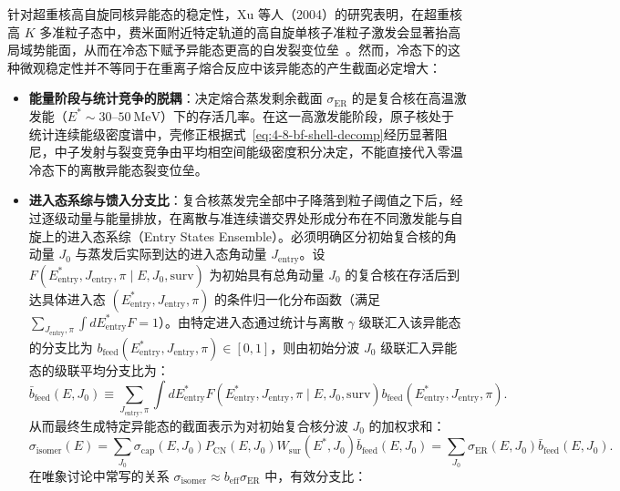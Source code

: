针对超重核高自旋同核异能态的稳定性，Xu 等人（2004）的研究表明，在超重核高 $K$ 多准粒子态中，费米面附近特定轨道的高自旋单核子准粒子激发会显著抬高局域势能面，从而在冷态下赋予异能态更高的自发裂变位垒~\cite{xu-2004-superheavy-high-spin-isomer-stability}。然而，冷态下的这种微观稳定性并不等同于在重离子熔合反应中该异能态的产生截面必定增大：
\begin{itemize}
\item \textbf{能量阶段与统计竞争的脱耦}：决定熔合蒸发剩余截面 $\sigma_{\mathrm{ER}}$ 的是复合核在高温激发能（$E^* \sim 30$--$50\ \mathrm{MeV}$）下的存活几率。在这一高激发能阶段，原子核处于统计连续能级密度谱中，壳修正根据式~\eqref{eq:4-8-bf-shell-decomp}经历显著阻尼，中子发射与裂变竞争由平均相空间能级密度积分决定，不能直接代入零温冷态下的离散异能态裂变位垒。
\item \textbf{进入态系综与馈入分支比}：复合核蒸发完全部中子降落到粒子阈值之下后，经过逐级动量与能量排放，在离散与准连续谱交界处形成分布在不同激发能与自旋上的进入态系综（Entry States Ensemble）。必须明确区分初始复合核的角动量 $J_0$ 与蒸发后实际到达的进入态角动量 $J_{\mathrm{entry}}$。设 $F(E_{\mathrm{entry}}^*, J_{\mathrm{entry}}, \pi \mid E, J_0, \mathrm{surv})$ 为初始具有总角动量 $J_0$ 的复合核在存活后到达具体进入态 $(E_{\mathrm{entry}}^*, J_{\mathrm{entry}}, \pi)$ 的条件归一化分布函数（满足 $\sum_{J_{\mathrm{entry}}, \pi} \int dE_{\mathrm{entry}}^* F = 1$）。由特定进入态通过统计与离散 $\gamma$ 级联汇入该异能态的分支比为 $b_{\mathrm{feed}}(E_{\mathrm{entry}}^*, J_{\mathrm{entry}}, \pi) \in [0, 1]$，则由初始分波 $J_0$ 级联汇入异能态的级联平均分支比为：
\begin{equation}\label{eq:4-8-bfeed-j0-def}
\bar{b}_{\mathrm{feed}}(E, J_0) \equiv \sum_{J_{\mathrm{entry}}, \pi} \int dE_{\mathrm{entry}}^* F(E_{\mathrm{entry}}^*, J_{\mathrm{entry}}, \pi \mid E, J_0, \mathrm{surv}) b_{\mathrm{feed}}(E_{\mathrm{entry}}^*, J_{\mathrm{entry}}, \pi).
\end{equation}
从而最终生成特定异能态的截面表示为对初始复合核分波 $J_0$ 的加权求和：
\begin{equation}\label{eq:4-8-isomer-feeding-ensemble}
\sigma_{\mathrm{isomer}}(E) = \sum_{J_0} \sigma_{\mathrm{cap}}(E, J_0) P_{\mathrm{CN}}(E, J_0) W_{\mathrm{sur}}(E^*, J_0) \bar{b}_{\mathrm{feed}}(E, J_0) = \sum_{J_0} \sigma_{\mathrm{ER}}(E, J_0) \bar{b}_{\mathrm{feed}}(E, J_0).
\end{equation}
在唯象讨论中常写的关系 $\sigma_{\mathrm{isomer}} \approx b_{\mathrm{eff}} \sigma_{\mathrm{ER}}$ 中，有效分支比：
\begin{equation}\label{eq:4-8-beff-def}

\end{equation}
\end{itemize}
